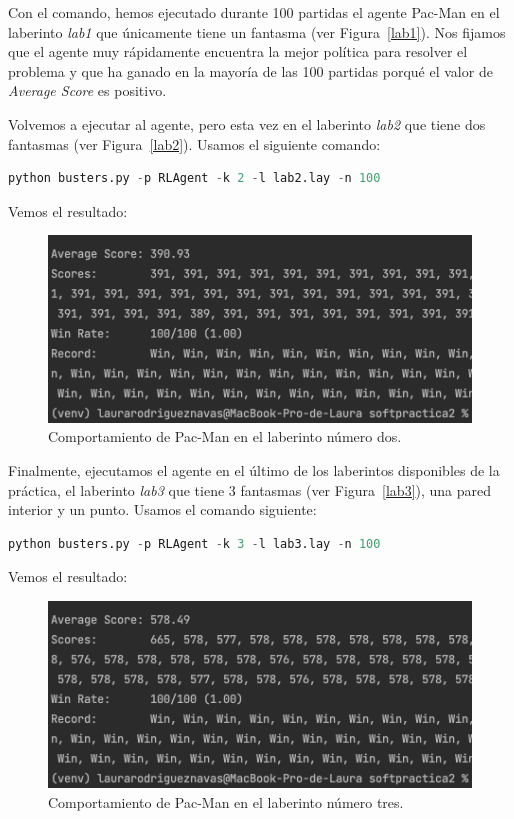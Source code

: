 \documentclass[11pt]{exam}
\begin{document}
Con el comando, hemos ejecutado durante 100 partidas el agente Pac-Man en el laberinto \textit{lab1} que únicamente tiene un fantasma (ver Figura~\ref{lab1}). Nos fijamos que el agente muy rápidamente encuentra la mejor política para resolver el problema y que ha ganado en la mayoría de las 100 partidas porqué el valor de \textit{Average Score} es positivo.
\vspace*{3mm}

Volvemos a ejecutar al agente, pero esta vez en el laberinto \textit{lab2} que tiene dos fantasmas (ver Figura~\ref{lab2}). Usamos el siguiente comando:

\begin{lstlisting}[language=python, basicstyle=\footnotesize]
	python busters.py -p RLAgent -k 2 -l lab2.lay -n 100
\end{lstlisting}
\vspace*{3mm}

Vemos el resultado:

\begin{figure}[H]
	\centering
	\includegraphics[scale=0.5]{result_lab2}
	\caption{Comportamiento de Pac-Man en el laberinto número dos.}
	\label{result_lab2}
\end{figure}

Finalmente, ejecutamos el agente en el último de los laberintos disponibles de la práctica, el laberinto \textit{lab3} que tiene 3 fantasmas (ver Figura~\ref{lab3}), una pared interior y un punto. Usamos el comando siguiente:

\begin{lstlisting}[language=python, basicstyle=\footnotesize]
	python busters.py -p RLAgent -k 3 -l lab3.lay -n 100
\end{lstlisting}

Vemos el resultado:

\begin{figure}[H]
	\centering
	\includegraphics[scale=0.5]{result_lab3}
	\caption{Comportamiento de Pac-Man en el laberinto número tres.}
	\label{result_lab3}
\end{figure}
\end{document}
